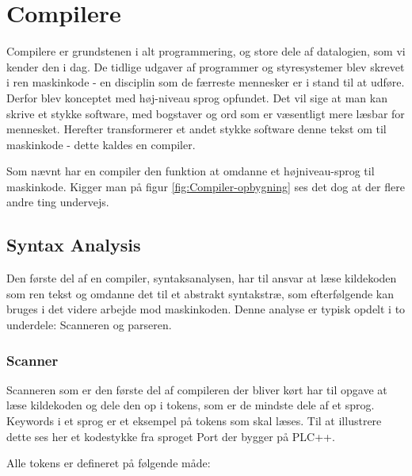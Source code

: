 \section{Compilere}
Compilere er grundstenen i alt programmering, og store dele af datalogien, som vi kender den i dag. De tidlige udgaver af programmer og styresystemer blev skrevet i ren maskinkode - en disciplin som de færreste mennesker er i stand til at udføre. Derfor blev konceptet med høj-niveau sprog opfundet. Det vil sige at man kan skrive et stykke software, med bogstaver og ord som er væsentligt mere læsbar for mennesket. Herefter transformerer et andet stykke software denne tekst om til maskinkode - dette kaldes en compiler.


\noindent Som nævnt har en compiler den funktion at omdanne et højniveau-sprog til maskinkode. Kigger man på figur \ref{fig:Compiler-opbygning} ses det dog at der flere andre ting undervejs.

\subsection{Syntax Analysis}\label{ssec:syntaxanalysis}
Den første del af en compiler, syntaksanalysen, har til ansvar at læse kildekoden som ren tekst og omdanne det til et abstrakt syntakstræ, som efterfølgende kan bruges i det videre arbejde mod maskinkoden. Denne analyse er typisk opdelt i to underdele: Scanneren og parseren. 

\subsubsection{Scanner}
Scanneren som er den første del af compileren der bliver kørt har til opgave at læse kildekoden og dele den op i tokens, som er de mindste dele af et sprog. Keywords i et sprog er et eksempel på tokens som skal læses. Til at illustrere dette ses her et kodestykke fra sproget Port der bygger på PLC++.


Alle tokens er defineret på følgende måde:


